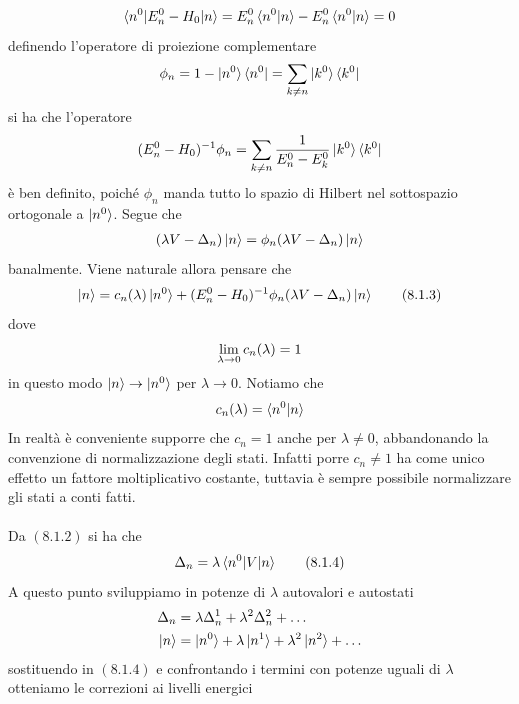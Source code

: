 \documentclass{article}
\begin{document}
\begin{gather}
    \braket{n^0|E_n^0 - H_0|n} = E_n^0\braket{n^0|n} - E_n^0\braket{n^0|n} = 0 \notag
\end{gather}
definendo l'operatore di proiezione complementare
\begin{gather}
    \phi_n = 1 - \ket{n^0}\bra{n^0} = \sum_{k \neq n} \ket{k^0}\bra{k^0} \notag
\end{gather}
si ha che l'operatore
\begin{gather}
    (E_n^0 - H_0)^{-1}\phi_n = \sum_{k \neq n} \frac{1}{E_n^0 - E_k^0} \ket{k^0}\bra{k^0} \notag
\end{gather}
è ben definito, poiché $\phi_n$ manda tutto lo spazio di Hilbert nel sottospazio ortogonale a $\ket{n^0}$. Segue che
\begin{gather}
    (\lambda V - \Delta_n)\ket{n} = \phi_n(\lambda V - \Delta_n)\ket{n} \notag
\end{gather}
banalmente. Viene naturale allora pensare che
\begin{gather}
    \ket{n} = c_n(\lambda)\ket{n^0} + (E_n^0 - H_0)^{-1}\phi_n(\lambda V - \Delta_n)\ket{n} \tag{8.1.3}
\end{gather}
dove
\begin{gather}
    \lim_{\lambda \rightarrow 0} c_n(\lambda) = 1 \notag
\end{gather}
in questo modo $\ket{n} \rightarrow \ket{n^0}$ per $\lambda \rightarrow 0$. Notiamo che
\begin{gather}
    c_n(\lambda) = \braket{n^0|n} \notag
\end{gather}
In realtà è conveniente supporre che $c_n = 1$ anche per $\lambda \neq 0$, abbandonando la convenzione di normalizzazione degli stati. Infatti porre $c_n \neq 1$ ha come unico effetto un fattore moltiplicativo costante, tuttavia è sempre possibile normalizzare gli stati a conti fatti. \\ \\
Da $(8.1.2)$ si ha che
\begin{gather}
    \Delta_n = \lambda\braket{n^0|V|n} \tag{8.1.4}
\end{gather}
A questo punto sviluppiamo in potenze di $\lambda$ autovalori e autostati
\begin{align}
    \Delta_n &= \lambda\Delta_n^1 + \lambda^2\Delta_n^2 + \dots \notag \\
    \ket{n} &= \ket{n^0} + \lambda\ket{n^1} + \lambda^2\ket{n^2} + \dots \notag
\end{align}
sostituendo in $(8.1.4)$ e confrontando i termini con potenze uguali di $\lambda$ otteniamo le correzioni ai livelli energici
\end{document}

